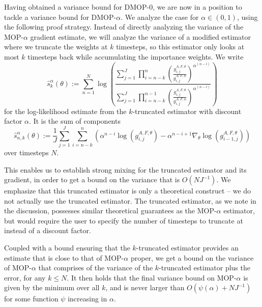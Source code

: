 Having obtained a variance bound for DMOP-$0$, we are now in a position to tackle a variance bound for DMOP-$\alpha$.
We analyze the case for $\alpha \in (0,1)$, using the following proof strategy.
Instead of directly analyzing the variance of the MOP-$\alpha$ gradient estimate, we will analyze the variance of a modified estimator where we truncate the weights at $k$ timesteps, so this estimator only looks at most $k$ timesteps back while accumulating the importance weights.
We write
\begin{equation}
    \hat s_k^\alpha(\theta) := \sum_{n=1}^N \log\left(\frac{\sum_{j=1}^J\prod_{i=n-k}^n\left(\frac{g_{i,j}^{A,F,\theta}}{g_{i,j}^{A,F,\phi}} \right)^{\alpha^{(n-i)}}}{\sum_{j=1}^J\prod_{i=n-k}^{n-1}\left(\frac{g_{i,j}^{A,F,\theta}}{g_{i,j}^{A,F,\phi}} \right)^{\alpha^{(n-i)}}}\right)
\end{equation}
for the log-likelihood estimate from the $k$-truncated estimator with discount factor $\alpha$. It is the sum of components
\begin{equation}
\hat s_{n,k}^\alpha(\theta) := \frac{1}{J}\sum_{j=1}^J\sum_{i=n-k}^n \left(\alpha^{n-i} \log\left(g_{i,j}^{A,F,\theta}\right)- \alpha^{n-i+1} \nabla_\theta \log\left(g_{i-1,j}^{A,F,\theta}\right)\right)
\end{equation} 
over timesteps $N$.

This enables us to establish strong mixing for the truncated estimator and its gradient, in order to get a bound on the variance that is $O(NJ^{-1})$.
We emphasize that this truncated estimator is only a theoretical construct -- we do not actually use the truncated estimator.
The truncated estimator, as we note in the discussion, possesses similar theoretical guarantees as the MOP-$\alpha$ estimator, but would require the user to specify the number of timesteps to truncate at instead of a discount factor. 

Coupled with a bound ensuring that the $k$-truncated estimator provides an estimate that is close to that of MOP-$\alpha$ proper, we get a bound on the variance of MOP-$\alpha$ that comprises of the variance of the $k$-truncated estimator plus the error, for any $k \leq N$.
It then holds that the final variance bound on MOP-$\alpha$ is given by the minimum over all $k$, and is never larger than $O(\psi(\alpha)+NJ^{-1})$ for some function $\psi$ increasing in $\alpha$. 


